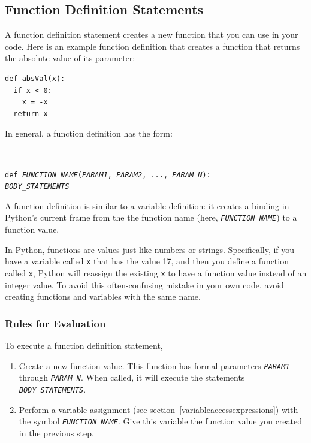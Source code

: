 \documentclass{article}
\makeatletter
\newcommand{\expr}[1]{\texttt{#1}}
\newcommand{\val}[1]{\mytextsf{#1}}
\newcommand{\mvar}[1]{\expr{\emph{\uppercase{#1}}}}
\newcommand{\pretabularspace}{\ifhevea\else \strut \\ \strut \fi}
\newcommand{\mytextsf}[1]{{\@span{style="font-family:sans-serif"}#1}}
\newcommand{\mytextsf}[1]{\textsf{#1}}
\makeatother
\begin{document}
\subsection{Function Definition Statements}

  A function definition statement creates a new function that you can use in your code. Here is an example function definition that creates a function that returns the absolute value of its parameter:

\begin{verbatim}
def absVal(x):
  if x < 0:
    x = -x
  return x
\end{verbatim}

  In general, a function definition has the form:

  \pretabularspace
  \noindent \expr{def \mvar{function\_name}(\mvar{param1}, \mvar{param2}, ..., \mvar{param\_n}):} \\
  \indent \mvar{BODY\_STATEMENTS}

A function definition is similar to a variable definition:  it creates a
binding in Python's current frame from the the function name (here,
\mvar{FUNCTION\_NAME}) to a function value.

In Python, functions are values just like numbers or strings.
Specifically, if you have a variable called \expr{x} that has the value
\val{17}, and then you define a function called \expr{x}, Python will
reassign the existing \expr{x} to have a function value instead of an
integer value.  To avoid this often-confusing mistake in your own code,
avoid creating functions and variables with the same name.


\subsubsection{Rules for Evaluation}

  To execute a function definition statement,

  \begin{enumerate}
    \item
    Create a new function value.  This function has formal parameters
    \mvar{PARAM1} through \mvar{PARAM\_N}.  When called, it will execute
    the statements \mvar{BODY\_STATEMENTS}.

    \item
    Perform a variable assignment (see section~\ref{variableaccessexpressions}) with the symbol \mvar{FUNCTION\_NAME}. Give this variable the function value you created in the previous step.

  \end{enumerate}
\end{document}
